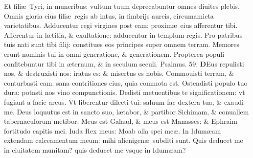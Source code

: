 \documentclass[a5paper,10pt]{book}
\def\ae{æ}
\begin{document}
\begin{multicols*}{2}
\newline \color{red} E\color{black}t fili\ae \ Tyri, in muneribus: vultum tuum deprecabuntur omnes diuites plebis.
\newline \color{red} O\color{black}mnis gloria eius fili\ae \ regis ab intus, in fimbrijs aureis, circumamicta varietatibus.
\newline \color{red} A\color{black}dducentur regi virgines post eam: proxim\ae \ eius afferentur tibi.
\newline \color{red} A\color{black}fferentur in l\ae titia, \& exultatione: adducentur in templum regis.
\newline \color{red} P\color{black}ro patribus tuis nati sunt tibi filij: constitues eos principes super omnem terram.
\newline \color{red} M\color{black}emores erunt nominis tui in omni generatione, \& generationem.
\newline \color{red} P\color{black}ropterea populi confitebuntur tibi in \ae ternum, \& in seculum seculi.
\newline \color{red} Psalmus. \hypertarget{ps59}{59.} \color{black}
\vspace{-.5em}
\lettrine[lines=2]{\bfseries \color{red} D}{}Eus repulisti nos, \& destruxisti nos: iratus es: \& misertus es nobis.
\newline \color{red} C\color{black}ommouisti terram, \& conturbasti eam: sana contritiones eius, quia commota est.
\newline \color{red} O\color{black}stendisti populo tuo dura: potasti nos vino compunctionis.
\newline \color{red} D\color{black}edisti metuentibus te significationem: vt fugiant a facie arcus.
\newline \color{red} V\color{black}t liberentur dilecti tui: saluum fac dextera tua, \& exaudi me.
\newline \color{red} D\color{black}eus loquutus est in sancto suo, l\ae tabor, \& partibor Sichimam, \& conuallem tabernaculorum metibor.
\newline \color{red} M\color{black}eus est Galaad, \& meus est Manasses: \& Ephraim fortitudo capitis mei.
\newline \color{red} I\color{black}uda Rex meus: Moab olla spei me\ae .
\newline \color{red} I\color{black}n Idum\ae am extendam calceamentum meum: mihi alienigen\ae \ subditi sunt.
\newline \color{red} Q\color{black}uis deducet me in ciuitatem munitam? quis deducet me vsque in Idum\ae am?

\end{multicols*}
\end{document}
